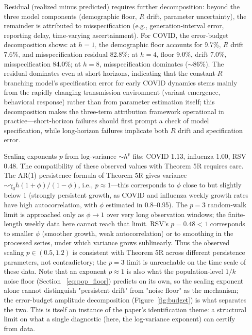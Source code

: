 \documentclass[review]{elsarticle}
\theoremstyle{plain}
\theoremstyle{definition}
\begin{document}
Residual (realized minus predicted) requires further decomposition: beyond the three model components (demographic floor, $R$ drift, parameter uncertainty), the remainder is attributed to misspecification (e.g., generation-interval error, reporting delay, time-varying ascertainment). For COVID, the error-budget decomposition shows: at $h = 1$, the demographic floor accounts for 9.7\%, $R$ drift 7.6\%, and misspecification residual 82.8\%; at $h = 4$, floor 9.0\%, drift 7.0\%, misspecification 84.0\%; at $h = 8$, misspecification dominates ($\sim$86\%). The residual dominates even at short horizons, indicating that the constant-$R$ branching model's specification error for early COVID dynamics stems mainly from the rapidly changing transmission environment (variant emergence, behavioral response) rather than from parameter estimation itself; this decomposition makes the three-term attribution framework operational in practice---short-horizon failures should first prompt a check of model specification, while long-horizon failures implicate both $R$ drift and specification error.

Scaling exponents $p$ from log-variance $\sim h^p$ fits: COVID 1.13, influenza 1.00, RSV 0.48. The compatibility of these observed values with Theorem 5R requires care. The AR(1) persistence formula of Theorem 5R gives variance $\sim \gamma_0 h (1+\phi)/(1-\phi)$, i.e., $p \approx 1$---this corresponds to $\phi$ close to but slightly below 1 (strongly persistent growth, as COVID and influenza weekly growth rates have high autocorrelation, with $\phi$ estimated in 0.8--0.95). The $p = 3$ random-walk limit is approached only as $\phi \to 1$ over very long observation windows; the finite-length weekly data here cannot reach that limit. RSV's $p = 0.48 < 1$ corresponds to smaller $\phi$ (smoother growth, weak autocorrelation) or to smoothing in the processed series, under which variance grows sublinearly. Thus the observed scaling $p \in (0.5, 1.2)$ is consistent with Theorem 5R across different persistence parameters, not contradictory; the $p = 3$ limit is unreachable on the time scale of these data. Note that an exponent $p \approx 1$ is also what the population-level $1/k$ noise floor (Section~
\ref{eq:pop_floor}) predicts on its own, so the scaling exponent alone cannot distinguish "persistent drift" from "noise floor" as the mechanism; the error-budget amplitude decomposition (Figure~\ref{fig:budget}) is what separates the two. This is itself an instance of the paper's identification theme: a structural limit on what a single diagnostic (here, the log-variance exponent) can certify from data.
\end{document}
